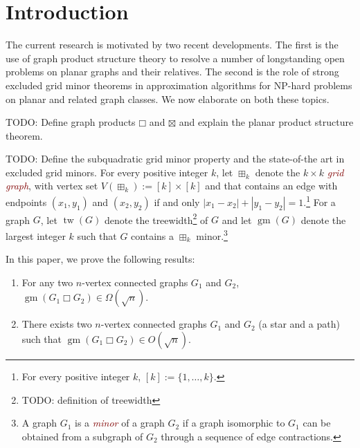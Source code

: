 \documentclass[kpfonts,lotsofwhite]{patmorin}
\newcommand{\defn}[1]{\textcolor{Maroon}{\emph{#1}}}
\newcommand{\boxprod}{\mathbin{\Box}}
\DeclareMathOperator{\tw}{tw}
\DeclareMathOperator{\gm}{gm}
\theoremstyle{plain}
\theoremstyle{definition}
\begin{document}



\section{Introduction}

The current research is motivated by two recent developments. The first is the use of graph product structure theory to resolve a number of longstanding open problems on planar graphs and their relatives.  The second is the role of strong excluded grid minor theorems in approximation algorithms for NP-hard problems on planar and related graph classes.  We now elaborate on both these topics.

TODO: Define graph products $\boxprod$ and $\boxtimes$ and explain the planar product structure theorem.

TODO: Define the subquadratic grid minor property and the state-of-the art in excluded grid minors.
For every positive integer $k$, let $\boxplus_k$ denote the $k\times k$ \defn{grid graph}, with vertex set $V(\boxplus_k):=[k]\times[k]$ and that contains an edge with endpoints $(x_1,y_1)$ and $(x_2,y_2)$ if and only $|x_1-x_2| + |y_1-y_2|=1$.\footnote{For every positive integer $k$, $[k]:=\{1,\ldots,k\}$.}  For a graph $G$, let $\tw(G)$ denote the treewidth\footnote{TODO: definition of treewidth} of $G$ and let $\gm(G)$ denote the largest integer $k$ such that $G$ contains a $\boxplus_k$ minor.\footnote{A graph $G_1$ is a \defn{minor} of a graph $G_2$ if a graph isomorphic to $G_1$ can be obtained from a subgraph of $G_2$ through a sequence of edge contractions.}

In this paper, we prove the following results:

\begin{enumerate}
   \item  For any two $n$-vertex connected graphs $G_1$ and $G_2$, $\gm(G_1\boxprod G_2) \in \Omega(\sqrt{n})$.
   \item There exists two $n$-vertex connected graphs $G_1$ and $G_2$ (a star and a path) such that $\gm(G_1\boxprod G_2) \in O(\sqrt{n})$.
\end{enumerate}
\end{document}
